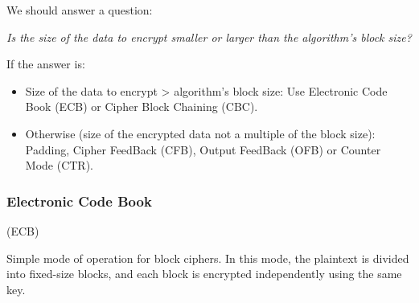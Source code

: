 We should answer a question:
\begin{tcolorbox}[colframe=lightblue]
    \begin{center}
        \textit{Is the size of the data to encrypt smaller or larger than \newline the algorithm's block size?}
    \end{center}
\end{tcolorbox}
    

If the answer is:
\begin{itemize}
    \item Size of the data to encrypt > algorithm's block size: Use Electronic Code Book (ECB) or Cipher Block Chaining (CBC).
    \item Otherwise (size of the encrypted data not a multiple of the block size): Padding, Cipher FeedBack (CFB), Output FeedBack (OFB) or Counter Mode (CTR).
\end{itemize}

\subsubsection{Electronic Code Book}
\begin{center}
    (ECB)
\end{center}

Simple mode of operation for block ciphers. In this mode, the plaintext is divided into fixed-size blocks, and each block is encrypted independently using the same key.

